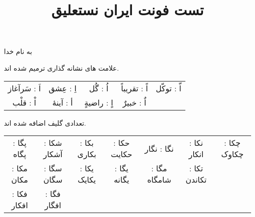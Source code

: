 \documentclass[14pt,a4paper]{article}
\begin{document}
\title{تست فونت ایران نستعلیق}
\author{ }\date{ }

\maketitle

\begin{center}
به نام خدا
\end{center}

علامت های نشانه گذاری ترمیم شده اند.

\vspace{3mm}
\begin{tabular}{c c c c c}
 اَ : سَرآغاز & اِ : عِشق & اُ : گُل & اً : تقریباً & اّ : توکّل \\
  اْ : قلْب & أ : آینهٔ & اٍ : راضیةٍ & اٌ : خبیرٌ & 
\end{tabular}
\vspace{3mm}

تعدادی گلیف اضافه شده اند.

\vspace{3mm}
\begin{tabular}{c c c c c c c}
پگا : پگاه & شکا : آشکار & بکا : بکاری & حکا : حکایت & نگا : نگار & نکا : انکار & چکا : چکاوک \\
مکا : مکان & سگا : سگان & یکا : یکایک & یگا : یگانه & مگا : شامگاه & تکا : تکاندن \\
فکا : افکار & فگا : افگار \\
\end{tabular}
\vspace{3mm}
\end{document}
